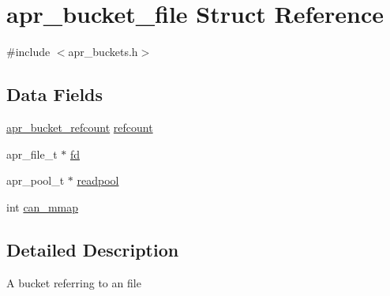 \hypertarget{structapr__bucket__file}{\section{apr\-\_\-bucket\-\_\-file Struct Reference}
\label{structapr__bucket__file}
}


{\ttfamily \#include $<$apr\-\_\-buckets.\-h$>$}

\subsection*{Data Fields}
\begin{DoxyCompactItemize}
\item 
\hyperlink{structapr__bucket__refcount}{apr\-\_\-bucket\-\_\-refcount} \hyperlink{structapr__bucket__file_ab0c123f34b85a07b601dc9794f8eed09}{refcount}
\item 
apr\-\_\-file\-\_\-t $\ast$ \hyperlink{structapr__bucket__file_aa43154c0bc9d41ba4b0762c906de432f}{fd}
\item 
apr\-\_\-pool\-\_\-t $\ast$ \hyperlink{structapr__bucket__file_a61b5603482215f6c9ace7b26fa12b884}{readpool}
\item 
int \hyperlink{structapr__bucket__file_a7812a8d6e6f10d0095569f04d3423e83}{can\-\_\-mmap}
\end{DoxyCompactItemize}


\subsection{Detailed Description}
A bucket referring to an file 

